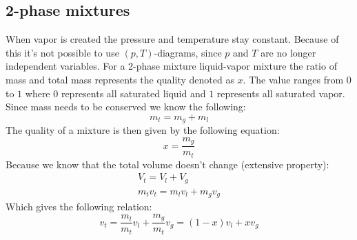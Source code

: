 \documentclass[11pt, a4paper]{article}
\begin{document}
\subsection{2-phase mixtures}
When vapor is created the pressure and temperature stay constant. Because of this it's not possible to use $(p, T)$-diagrams, since $p$ and $T$ are no longer independent variables. For a 2-phase mixture liquid-vapor mixture the ratio of mass and total mass represents the quality denoted as $x$. The value ranges from $0$ to $1$ where $0$ represents all saturated liquid and $1$ represents all saturated vapor. Since mass needs to be conserved we know the following:
\begin{equation}
  m_{t} = m_g + m_l
\end{equation}
The quality of a mixture is then given by the following equation:
\begin{equation}
  x = \frac{m_g}{m_{t}}
\end{equation}
Because we know that the total volume doesn't change (extensive property):
\begin{gather}
  V_{t} = V_l + V_g\\
  m_{t}v_{t} = m_lv_l + m_gv_g
\end{gather}
Which gives the following relation:
\begin{equation}
  v_t = \frac{m_l}{m_{t}}v_l + \frac{m_g}{m_{t}} v_g = (1 - x)v_l + xv_g
\end{equation}
\end{document}

